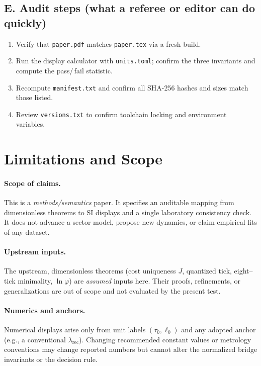 \documentclass[11pt]{article}
\theoremstyle{plain}
\theoremstyle{definition}
\theoremstyle{remark}
\begin{document}
\subsection*{E. Audit steps (what a referee or editor can do quickly)}
\begin{enumerate}
  \item Verify that \texttt{paper.pdf} matches \texttt{paper.tex} via a fresh build.
  \item Run the display calculator with \texttt{units.toml}; confirm the three invariants and compute the pass/\,fail statistic.
  \item Recompute \texttt{manifest.txt} and confirm all SHA-256 hashes and sizes match those listed.
  \item Review \texttt{versions.txt} to confirm toolchain locking and environment variables.
\end{enumerate}

\section{Limitations and Scope}

\paragraph{Scope of claims.}
This is a \emph{methods/semantics} paper. It specifies an auditable mapping from dimensionless theorems to SI displays and a single laboratory consistency check. It does not advance a sector model, propose new dynamics, or claim empirical fits of any dataset.

\paragraph{Upstream inputs.}
The upstream, dimensionless theorems (cost uniqueness \(J\), quantized tick, eight–tick minimality, \(\ln\varphi\)) are \emph{assumed} inputs here. Their proofs, refinements, or generalizations are out of scope and not evaluated by the present test.

\paragraph{Numerics and anchors.}
Numerical displays arise only from unit labels \((\tau_{0},\ell_{0})\) and any adopted anchor (e.g., a conventional \(\lambda_{\mathrm{rec}}\)). Changing recommended constant values or metrology conventions may change reported numbers but cannot alter the normalized bridge invariants or the decision rule.
\end{document}

